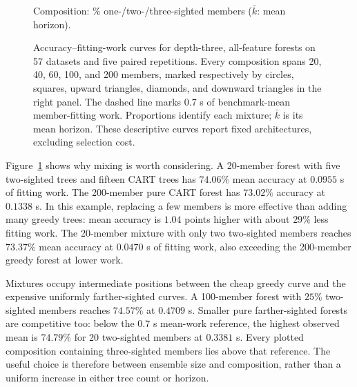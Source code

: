 \documentclass[final,5p,times]{elsarticle}
\begin{document}
\begin{figure}[t]
\par\smallskip\scriptsize Composition: \% one-/two-/three-sighted members ($\bar k$: mean horizon).
\par{}
\caption{Accuracy--fitting-work curves for depth-three, all-feature forests on 57 datasets and five paired repetitions. Every composition spans 20, 40, 60, 100, and 200 members, marked respectively by circles, squares, upward triangles, diamonds, and downward triangles in the right panel. The dashed line marks 0.7 s of benchmark-mean member-fitting work. Proportions identify each mixture; $\bar k$ is its mean horizon. These descriptive curves report fixed architectures, excluding selection cost.}
\label{fig:tradeoff}
\end{figure}
Figure~\ref{fig:tradeoff} shows why mixing is worth considering.
A 20-member forest with five two-sighted trees and fifteen CART trees
has $74.06\%$ mean accuracy at $0.0955$ s of fitting work. The
200-member pure CART forest has $73.02\%$ accuracy at $0.1338$ s.
In this example, replacing a few members is more effective than
adding many greedy trees: mean accuracy is $1.04$ points higher
with about $29\%$ less fitting work. The 20-member mixture with
only two two-sighted members reaches $73.37\%$ mean accuracy at
$0.0470$ s of fitting work, also exceeding the 200-member greedy
forest at lower work.

Mixtures occupy intermediate positions between the cheap greedy
curve and the expensive uniformly farther-sighted curves. A
100-member forest with $25\%$ two-sighted members reaches
$74.57\%$ at $0.4709$ s. Smaller pure farther-sighted forests
are competitive too: below the $0.7$ s mean-work reference, the
highest observed mean is $74.79\%$ for 20 two-sighted members
at $0.3381$ s. Every plotted composition containing three-sighted
members lies above that reference. The useful choice is therefore
between ensemble size and composition, rather than a uniform
increase in either tree count or horizon.
\end{document}
